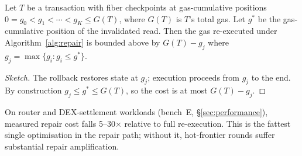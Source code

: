 \begin{lemma}
\label{lem:repair-cost}
Let $T$ be a transaction with fiber checkpoints at gas-cumulative
positions $0 = g_0 < g_1 < \cdots < g_K \leq G(T)$, where $G(T)$ is
$T$'s total gas. Let $g^*$ be the gas-cumulative position of the
invalidated read. Then the gas re-executed under
Algorithm~\ref{alg:repair} is bounded above by $G(T) - g_j$ where
$g_j = \max\{g_i : g_i \leq g^*\}$.
\end{lemma}

\begin{proof}[Sketch]
The rollback restores state at $g_j$; execution proceeds from $g_j$
to the end. By construction $g_j \leq g^* \leq G(T)$, so the cost is
at most $G(T) - g_j$.
\end{proof}

\begin{remark}
\label{rem:repair-router}
On router and DEX-settlement workloads (bench~E,
\S\ref{sec:performance}), measured repair cost falls 5--30$\times$
relative to full re-execution. This is the fattest single optimisation
in the repair path; without it, hot-frontier rounds suffer
substantial repair amplification.
\end{remark}


